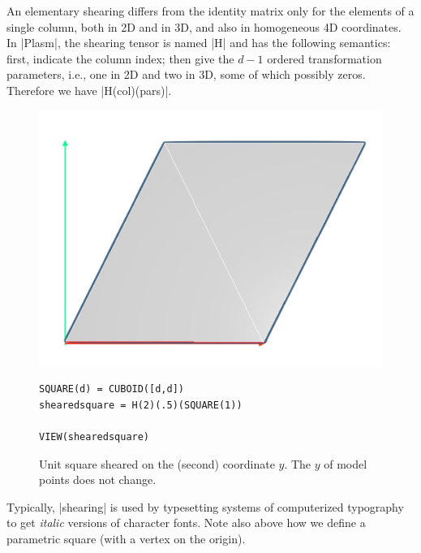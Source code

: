\begin{coding}
An elementary shearing differs from the identity matrix only for the elements of a single column, both in 2D and in 3D, and also in homogeneous 4D coordinates. 
In |Plasm|, the shearing tensor is named |H| and has the following semantics: first, indicate the column index; then give the $d-1$ ordered transformation parameters, i.e., one in 2D and two in 3D, some of which possibly zeros. Therefore we have |H(col)(pars)|.

\begin{figure}[htbp] %
\begin{minipage}[c]{0.35\textwidth}
   \includegraphics[width=\linewidth]{chapter-04/figs/shear2D} 
\end{minipage}\hfill
\begin{minipage}[c]{0.60\textwidth}
\begin{lstlisting}[language=JuliaLocal, style=julia, mathescape=true]
SQUARE(d) = CUBOID([d,d])
shearedsquare = H(2)(.5)(SQUARE(1))

VIEW(shearedsquare)
\end{lstlisting}
   \caption{Unit square sheared on the (second) coordinate $y$. The $y$ of model points does not change.}
\end{minipage}
\end{figure}

Typically, |shearing| is used by typesetting systems of computerized typography to get \emph{italic} versions of character fonts. Note also above how we define a parametric square (with a vertex on the origin).


\end{coding}
